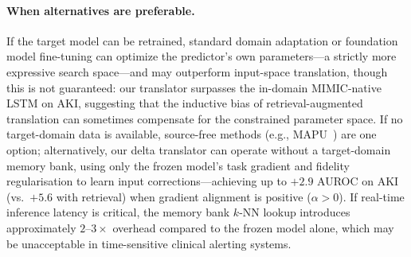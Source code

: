 \paragraph{When alternatives are preferable.}
If the target model can be retrained, standard domain adaptation or foundation
model fine-tuning can optimize the predictor's own parameters---a strictly more
expressive search space---and may outperform input-space translation, though
this is not guaranteed: our translator surpasses the in-domain MIMIC-native
LSTM on AKI, suggesting that the inductive bias of retrieval-augmented
translation can sometimes compensate for the constrained parameter space.
If no target-domain data is available, source-free methods
(e.g., MAPU~\cite{ragab2023mapu}) are one option; alternatively,
our delta translator can operate without a target-domain memory bank,
using only the frozen model's task gradient and fidelity regularisation
to learn input corrections---achieving up to $+2.9$ AUROC on AKI
(vs.\ $+5.6$ with retrieval) when gradient alignment is positive ($\alpha > 0$).
If real-time inference latency is critical, the memory bank $k$-NN lookup
introduces approximately $2$--$3\times$ overhead compared to the frozen model
alone, which may be unacceptable in time-sensitive clinical alerting systems.

